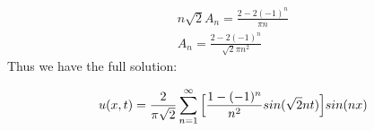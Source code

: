 \documentclass{article}
\begin{document}
\begin{equation}
\begin{aligned}
n\sqrt{2}A_n  = \frac{2- 2(-1)^n}{\pi n}\\
A_n = \frac{2- 2(-1)^n}{\sqrt{2}\pi n^2}
\end{aligned}
\end{equation}
Thus we have the full solution:
\begin{tcolorbox}[minipage,colback=white,arc=0pt,outer arc=0pt]
\begin{equation}
\begin{aligned}
u(x,t) = \frac{2}{\pi\sqrt{2}}\sum^{\infty}_{n=1}\Big{[}\frac{1-(-1)^n}{n^2}sin(\sqrt{2}nt)\Big{]}sin(nx)
\end{aligned}
\end{equation}
\end{tcolorbox}
\end{document}
